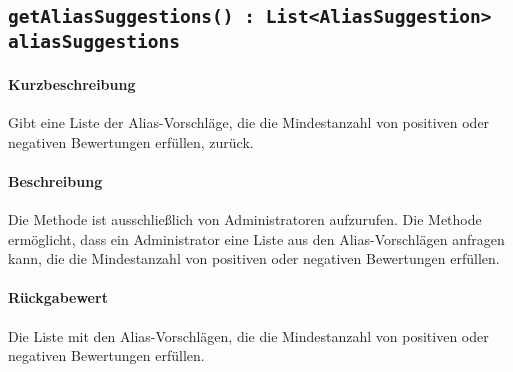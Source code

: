 \subsection{\texttt{getAliasSuggestions() : List<AliasSuggestion> aliasSuggestions}}%
\paragraph*{Kurzbeschreibung}
Gibt eine Liste der Alias-Vorschläge, die die Mindestanzahl von positiven oder negativen Bewertungen erfüllen, zurück.
\paragraph*{Beschreibung}
Die Methode ist ausschließlich von Administratoren aufzurufen.
Die Methode ermöglicht, dass ein Administrator eine Liste aus den Alias-Vorschlägen anfragen kann, die die Mindestanzahl von positiven oder negativen Bewertungen erfüllen.
\paragraph*{Rückgabewert}
Die Liste mit den Alias-Vorschlägen, die die Mindestanzahl von positiven oder negativen Bewertungen erfüllen.
